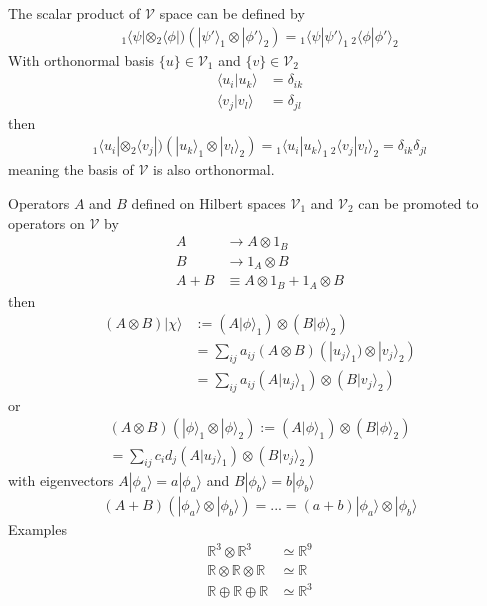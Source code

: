 \documentclass[10pt,a4paper]{book}
\theoremstyle{definition}
\begin{document}
The scalar product of $\mathcal{V}$ space can be defined by
\begin{align}
{}_1\langle\psi|\otimes{}_2\langle\phi|)
(|\psi'\rangle_1\otimes|\phi'\rangle_2)=
{}_1\langle\psi|\psi'\rangle_1\,{}_2\langle\phi|\phi'\rangle_2
\end{align}
With orthonormal basis $\{u\}\in\mathcal{V}_1$ and $\{v\}\in\mathcal{V}_2$
\begin{align}
\langle u_i|u_k\rangle&=\delta_{ik}\\
\langle v_j|v_l\rangle&=\delta_{jl}
\end{align}
then
\begin{align}
{}_1\langle u_i|\otimes{}_2\langle v_j|)
(|u_k\rangle_1\otimes|v_l\rangle_2)=
{}_1\langle u_i|u_k\rangle_1\,{}_2\langle v_j|v_l\rangle_2=\delta_{ik}\delta_{jl}
\end{align}
meaning the basis of $\mathcal{V}$ is also orthonormal.

Operators $A$ and $B$ defined on Hilbert spaces $\mathcal{V}_1$ and $\mathcal{V}_2$ can be promoted to operators on $\mathcal{V}$ by
\begin{align}
A&\rightarrow A\otimes 1_B\\
B&\rightarrow 1_A\otimes B\\
A+B&\equiv A\otimes 1_B + 1_A\otimes B
\end{align}
then
\begin{align}
(A \otimes B)|\chi\rangle 
&:=(A|\phi\rangle_1)\otimes (B|\phi\rangle_2)\\
&=\sum_{ij}a_{ij}(A\otimes B) (|u_j\rangle_1)\otimes |v_j\rangle_2)\\
&=\sum_{ij}a_{ij} (A|u_j\rangle_1)\otimes (B|v_j\rangle_2)
\end{align}
or
\begin{align}
(A \otimes B)(|\phi\rangle_1\otimes|\phi\rangle_2) 
:=(A|\phi\rangle_1)\otimes (B|\phi\rangle_2)\\
=\sum_{ij}c_id_j(A| u_j\rangle_1)\otimes (B|v_j\rangle_2)
\end{align}
with eigenvectors $A|\phi_a\rangle=a|\phi_a\rangle$ and $B|\phi_b\rangle=b|\phi_b\rangle$
\begin{align}
(A + B)(|\phi_a\rangle\otimes|\phi_b\rangle)=...
=(a+b) |\phi_a\rangle\otimes |\phi_b\rangle
\end{align}
Examples
\begin{align}
\mathbb{R}^3\otimes\mathbb{R}^3&\simeq\mathbb{R}^9\\
\mathbb{R}\otimes\mathbb{R}\otimes\mathbb{R}&\simeq\mathbb{R}\\
\mathbb{R}\oplus\mathbb{R}\oplus\mathbb{R}&\simeq\mathbb{R}^3
\end{align}
\end{document}
